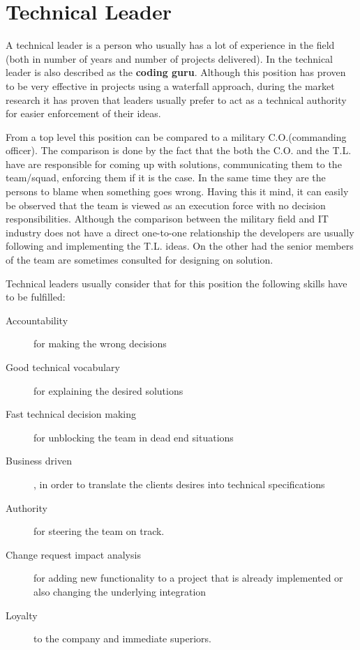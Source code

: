 \section{Technical Leader}
\label{sec:tech-lead}
A technical leader is a person who usually has a lot of experience in the field (both in number of years and number of projects delivered). In \cite{abur-tl} the technical leader is also described as the \textbf{coding guru}. Although this position has proven to be very effective in projects using a waterfall approach, during the market research it has proven that leaders usually prefer to act as a technical authority for easier enforcement of their ideas.

From a top level this position can be compared to a military C.O.(commanding officer). The comparison is done by the fact that the both the C.O. and the T.L. have are responsible for coming up with solutions, communicating them to the team/squad, enforcing them if it is the case. In the same time they are the persons to blame when something goes wrong. Having this it mind, it can easily be observed that the team is viewed as an execution force with no decision responsibilities.  Although the comparison between the military field and IT industry does not have a direct one-to-one relationship the developers are usually following and implementing the T.L. ideas. On the other had the senior members of the team are sometimes consulted for designing on solution.

Technical leaders usually consider that for this position the following skills have to be fulfilled:
\begin{description}
\item [Accountability] for making the wrong decisions
\item [Good technical vocabulary] for explaining the desired solutions
\item [Fast technical decision making] for unblocking the team in dead end situations
\item [Business driven], in order to translate the clients desires into technical specifications
\item [Authority] for steering the team on track.
\item [Change request impact analysis] for adding new functionality  to a project that is already implemented or also changing the underlying integration
\item [Loyalty] to the company and immediate superiors.
\end{description}

